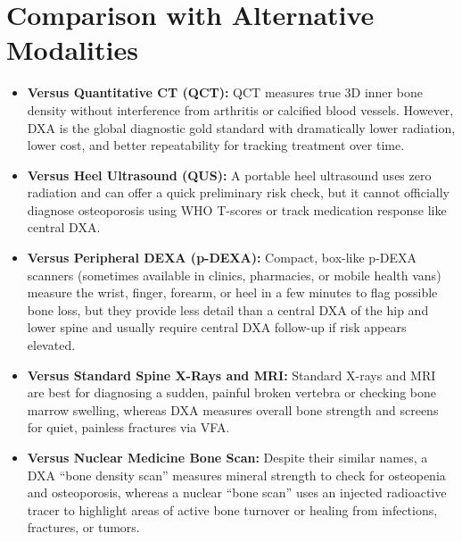\section{Comparison with Alternative Modalities}
\begin{itemize}
\item \textbf{Versus Quantitative CT (QCT):} QCT measures true 3D inner bone density without interference from arthritis or calcified blood vessels. However, DXA is the global diagnostic gold standard with dramatically lower radiation, lower cost, and better repeatability for tracking treatment over time.
\item \textbf{Versus Heel Ultrasound (QUS):} A portable heel ultrasound uses zero radiation and can offer a quick preliminary risk check, but it cannot officially diagnose osteoporosis using WHO T-scores or track medication response like central DXA.
\item \textbf{Versus Peripheral DEXA (p-DEXA):} Compact, box-like p-DEXA scanners (sometimes available in clinics, pharmacies, or mobile health vans) measure the wrist, finger, forearm, or heel in a few minutes to flag possible bone loss, but they provide less detail than a central DXA of the hip and lower spine and usually require central DXA follow-up if risk appears elevated.
\item \textbf{Versus Standard Spine X-Rays and MRI:} Standard X-rays and MRI are best for diagnosing a sudden, painful broken vertebra or checking bone marrow swelling, whereas DXA measures overall bone strength and screens for quiet, painless fractures via VFA.
\item \textbf{Versus Nuclear Medicine Bone Scan:} Despite their similar names, a DXA ``bone density scan'' measures mineral strength to check for osteopenia and osteoporosis, whereas a nuclear ``bone scan'' uses an injected radioactive tracer to highlight areas of active bone turnover or healing from infections, fractures, or tumors.
\end{itemize}

